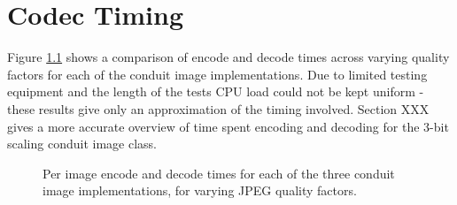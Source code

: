 \chapter{Codec Timing}

Figure \ref{graph:codec-speeds} shows a comparison of encode and decode times across varying quality factors for each of the conduit image implementations. Due to limited testing equipment and the length of the tests CPU load could not be kept uniform - these results give only an approximation of the timing involved. Section XXX gives a more accurate overview of time spent encoding and decoding for the 3-bit scaling conduit image class.

\begin{figure}[tbph]
  \begin{center}
    

    \caption{Per image encode and decode times for each of the three conduit image implementations, for varying JPEG quality factors.}
    \label{graph:codec-speeds}
  \end{center}
\end{figure}

